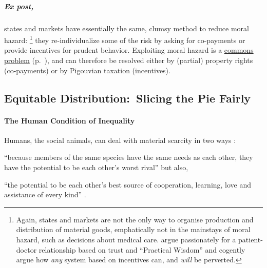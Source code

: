 \subparagraph{Ex post,} states and markets have essentially the same, clumsy method to reduce moral hazard:
\footnote{
	Again, states and markets are not the only way to organise production and distribution of material goods, emphatically not in the mainstays of moral hazard, such as decisions about medical care.
	\cite{Schwartz2010} argue passionately for a patient-doctor relationship based on trust and ``Practical Wisdom'' and cogently argue how \emph{any} system based on incentives can, and \emph{will} be perverted.
}
they re-individualize some of the risk by asking for co-payments or provide incentives for prudent behavior.
Exploiting moral hazard is a \hyperref[sec:common-good]{commons problem} (p.~\pageref{sec:common-good}), and can therefore be resolved either by (partial) property rights (co-payments) or by Pigouvian taxation (incentives).

\subsection[Equitable Distribution]{Equitable Distribution:\ Slicing the Pie Fairly} \label{sec:distribution}

\paragraph{The Human Condition of Inequality}  \label{sec:human-nature-of-inequality} Humans, the social animals, can deal with material scarcity in two ways \citep{Pickett-2009-kx}:
\begin{inparaenum}[1)]
	\item ``because members of the same species have the same needs as each other, they have the potential to be each other's worst rival'' \citeyearpar[197]{Pickett-2009-kx} but also,
	\item ``the potential to be each other's best source of cooperation, learning, love and assistance of every kind'' \citeyearpar[198]{Pickett-2009-kx}.
\end{inparaenum}

